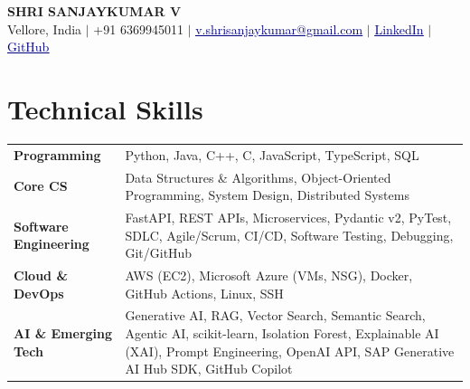 \documentclass[a4paper,10pt]{article}
\newcommand{\navylink}[2]{\href{#1}{\textcolor{navy}{\uline{#2}}}}
\begin{document}
\begin{center}
    {\fontsize{18.1}{21}\selectfont\bfseries SHRI SANJAYKUMAR V}\\[3pt]
    {\fontsize{10}{12}\selectfont Vellore, India $|$ +91 6369945011 $|$
    \navylink{mailto:v.shrisanjaykumar@gmail.com}{v.shrisanjaykumar@gmail.com} $|$
    \navylink{https://www.linkedin.com/in/shri-sanjaykumar-v-588bab28a/}{LinkedIn} $|$
    \navylink{https://github.com/Shri-Sanjaykumar}{GitHub}}
\end{center}
\vspace{-8pt}

\section{Technical Skills}
\begin{tabularx}{\textwidth}{@{}p{1.52in}X@{}}
\textbf{Programming} & Python, Java, C++, C, JavaScript, TypeScript, SQL \\
\textbf{Core CS} & Data Structures \& Algorithms, Object-Oriented Programming, System Design, Distributed Systems \\
\textbf{Software Engineering} & FastAPI, REST APIs, Microservices, Pydantic v2, PyTest, SDLC, Agile/Scrum, CI/CD, Software Testing, Debugging, Git/GitHub \\
\textbf{Cloud \& DevOps} & AWS (EC2), Microsoft Azure (VMs, NSG), Docker, GitHub Actions, Linux, SSH \\
\textbf{AI \& Emerging Tech} & Generative AI, RAG, Vector Search, Semantic Search, Agentic AI, scikit-learn, Isolation Forest, Explainable AI (XAI), Prompt Engineering, OpenAI API, SAP Generative AI Hub SDK, GitHub Copilot \\
\end{tabularx}

\end{document}
